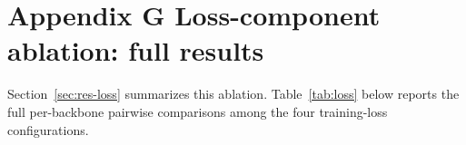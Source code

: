 \documentclass[pdflatex,sn-vancouver-num]{sn-jnl}
\newcommand{\appendixtablenumbering}[1]{%
  \renewcommand{\thetable}{#1\arabic{table}}%
  \renewcommand{\theHtable}{appendix-#1.\arabic{table}}%
  \setcounter{table}{0}%
}
\begin{document}
\FloatBarrier

\section*{Appendix G Loss-component ablation: full results}
\label{sec:supp-loss}
\appendixtablenumbering{G}

Section~\ref{sec:res-loss} summarizes this ablation. Table~\ref{tab:loss} below reports the full per-backbone pairwise comparisons among the four training-loss configurations.

\begin{tableorg}[htbp]
\centering
\caption{Downstream accuracy, all pairwise comparisons among four training-loss configurations, EarVN1.0, $n=5$ seeds, all eleven recognition backbones. Difference convention: ``A vs.\ B'' $=$ B minus A; $p_{\text{Bonf}}$ corrected across all 6 comparisons within each backbone. sig.\ $=p_{\text{Bonf}}{<}0.05$; trend $=0.05{\le}p_{\text{Bonf}}{<}0.10$; n.s.\ $=p_{\text{Bonf}}{\ge}0.10$. ``(equiv.)'' indicates TOST-confirmed equivalence within $\pm 1$ percentage point.}
\label{tab:loss}


\end{tableorg}
\end{document}
